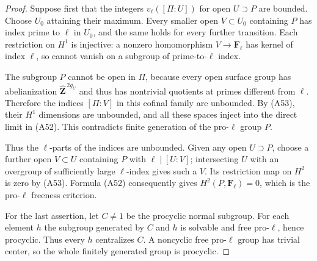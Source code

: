 \begin{proof}
Suppose first that the integers
$v_\ell([\Pi:U])$ for open $U\supset P$
are bounded. Choose $U_0$ attaining their
maximum. Every smaller open $V\subset U_0$
containing $P$ has index prime to $\ell$ in
$U_0$, and the same holds for every further
transition. Each restriction on $H^1$ is
injective: a nonzero homomorphism
$V\to\mathbf F_\ell$ has kernel of index
$\ell$, so cannot vanish on a subgroup of
prime-to-$\ell$ index.

The subgroup $P$ cannot be open in $\Pi$,
because every open surface group has
abelianization $\widehat{\mathbf Z}^{\,2g_U}$
and thus has nontrivial quotients at primes
different from $\ell$. Therefore the indices
$[\Pi:V]$ in this cofinal family are unbounded.
By (A53), their $H^1$ dimensions are unbounded,
and all these spaces inject into the direct
limit in (A52). This contradicts finite
generation of the pro-$\ell$ group $P$.

Thus the $\ell$-parts of the indices are
unbounded. Given any open $U\supset P$, choose
a further open $V\subset U$ containing $P$
with $\ell\mid[U:V]$; intersecting $U$ with
an overgroup of sufficiently large
$\ell$-index gives such a $V$.
Its restriction map on $H^2$ is zero by
(A53). Formula (A52) consequently gives
$H^2(P,\mathbf F_\ell)=0$, which is the
pro-$\ell$ freeness criterion.

For the last assertion, let $C\ne1$ be the
procyclic normal subgroup. For each element
$h$ the subgroup generated by $C$ and $h$
is solvable and free pro-$\ell$, hence
procyclic. Thus every $h$ centralizes $C$.
A noncyclic free pro-$\ell$ group has trivial
center, so the whole finitely generated group
is procyclic.
\end{proof}

